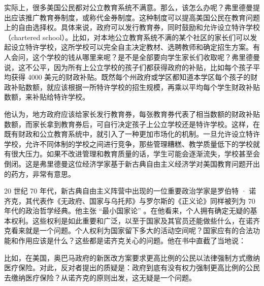 实际上，很多美国公民都对公立教育系统不满意。那么，该怎么办呢？弗里德曼提出应该推广教育券制度，或称代金券制度。这种制度可以提高美国公民在教育问题上的自由选择权。具体来说，政府可以发行教育券，同时鼓励和允许设立特许学校（chartered school）。比如，对本地公立教育系统不满的某个社区的家长们可以发起设立特许学校，这所学校可以完全自主决定教材、选聘教师和确定招生方案。有人会问，这个学校的钱从哪里来呢？是不是全部要向学生家长们收取呢？弗里德曼说，这不公平，因为所有上公立学校的孩子们都获得政府的补贴，比如每个孩子平均获得 4000 美元的财政补贴。既然每个州政府或学区都知道本学区每个孩子的财政补贴数额，就应该根据一所特许学校的招生规模，再乘以平均每个学生财政补贴数额，来补贴给特许学校。

他认为，地方政府应该给家长发行教育券，每张教育券代表了相当数额的财政补贴数额，而家长拿到教育券后，可自行决定孩子上公立学校还是特许学校。这样，在既有财政和公立教育系统中，就引入了一种更加市场化的机制。一旦允许设立特许学校，允许不同体制的学校之间进行竞争，那些管理糟糕、教学质量低下的学校就有很大压力。如果不改进管理和教育质量的话，学生可能会逐渐流失，学校甚至会倒闭。这是弗里德曼这位经济学家基于新古典自由主义经济学对美国教育问题开出的药方，非常有意思。

20 世纪 70 年代，新古典自由主义阵营中出现的一位重要政治学家是罗伯特 · 诺齐克，其代表作《无政府、国家与乌托邦》与罗尔斯的《正义论》同样被列为 70 年代的政治哲学经典。他主张 “最小国家论” 。在他看来，个人拥有确定无疑的基本权利。这些权利是如此重要和广泛，以至于国家及其官员还能做些什么，在诺齐克看来就是一个问题。个人权利为国家留下多大的活动空间呢？国家应有的合法功能和作用应该是什么？这些都是诺齐克关心的问题。他在书中直截了当地说：


比如，在美国，奥巴马政府的新医改方案要求更高比例的公民以法律强制方式缴纳医疗保险。对此，反对者提出的质疑是：政府到底有没有权力强制更高比例的公民去缴纳医疗保险？从诺齐克的原则出发，这无疑是一个问题。

